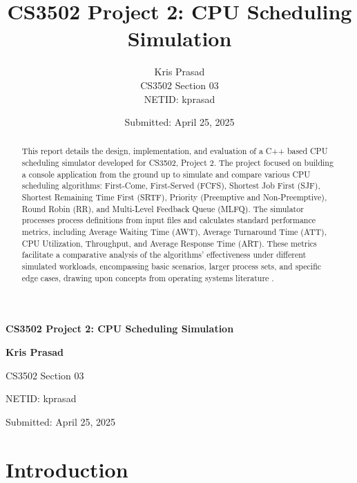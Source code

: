 \documentclass[12pt]{article}
\title{CS3502 Project 2: CPU Scheduling Simulation}
\author{Kris Prasad \\[0.5em]
CS3502 Section 03 \\[0.5em]
NETID: kprasad\\[0.5em]
}
\date{Submitted: April 25, 2025}
\begin{document}
\begin{titlepage}
    \centering
    \vspace*{2cm}
    
    {\LARGE\bfseries CS3502 Project 2: CPU Scheduling Simulation\par}
    \vspace{2cm}
    
    {\large\bfseries Kris Prasad\par}
    \vspace{0.5cm}
    {\large CS3502 Section 03\par}
    \vspace{0.5cm}
    {\large NETID: kprasad\par}
    \vspace{2cm}
    
    {\large Submitted: April 25, 2025\par}
    
    \vfill
    
\end{titlepage}

\newpage

\begin{abstract}
This report details the design, implementation, and evaluation of a C++ based CPU scheduling simulator developed for CS3502, Project 2. The project focused on building a console application from the ground up to simulate and compare various CPU scheduling algorithms: First-Come, First-Served (FCFS), Shortest Job First (SJF), Shortest Remaining Time First (SRTF), Priority (Preemptive and Non-Preemptive), Round Robin (RR), and Multi-Level Feedback Queue (MLFQ). The simulator processes process definitions from input files and calculates standard performance metrics, including Average Waiting Time (AWT), Average Turnaround Time (ATT), CPU Utilization, Throughput, and Average Response Time (ART). These metrics facilitate a comparative analysis of the algorithms' effectiveness under different simulated workloads, encompassing basic scenarios, larger process sets, and specific edge cases, drawing upon concepts from operating systems literature \citep{silberschatz2018operating}.
\end{abstract}

\newpage
\tableofcontents
\newpage

\section{Introduction}
\end{document}
